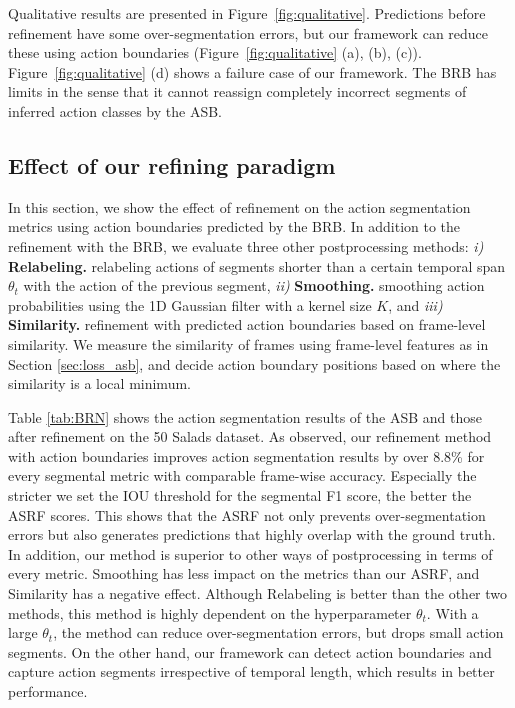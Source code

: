 \documentclass[10pt,twocolumn,letterpaper]{article}
\begin{document}
Qualitative results are presented in Figure~\ref{fig:qualitative}. 
Predictions before refinement have some over-segmentation errors, but our framework can reduce these using action boundaries (Figure~\ref{fig:qualitative} (a), (b), (c)).
Figure~\ref{fig:qualitative} (d) shows a failure case of our framework.
The BRB has limits in the sense that it cannot reassign completely incorrect segments
of inferred action classes by the ASB.


\subsection{Effect of our refining paradigm}
\label{sec:impact_asrf}
In this section, we show the effect of refinement on the action segmentation metrics using action boundaries predicted by the BRB.
In addition to the refinement with the BRB, we evaluate three other postprocessing methods:
\textit{i)} \textbf{Relabeling.} relabeling actions of segments shorter than a certain temporal span $\theta_t$ with the action of the previous segment,
\textit{ii)} \textbf{Smoothing.} smoothing action probabilities using the 1D Gaussian filter with a kernel size $K$, and
\textit{iii)} \textbf{Similarity.} refinement with predicted action boundaries based on frame-level similarity.
We measure the similarity of frames using frame-level features as in Section \ref{sec:loss_asb},
and decide action boundary positions based on where the similarity is a local minimum. 

Table \ref{tab:BRN} shows the action segmentation results of the ASB and those after refinement on the 50 Salads dataset.
As observed, our refinement method with action boundaries improves action segmentation results by over 8.8\% for every segmental metric with comparable frame-wise accuracy.
Especially the stricter we set the IOU threshold for the segmental F1 score, the better the ASRF scores.
This shows that the ASRF not only prevents over-segmentation errors but also generates predictions that highly overlap with the ground truth.
In addition, our method is superior to other ways of postprocessing in terms of every metric.
Smoothing has less impact on the metrics than our ASRF, and Similarity has a negative effect.
Although Relabeling is better than the other two methods, this method is highly dependent on the hyperparameter $\theta_t$.
With a large $\theta_t$, the method can reduce over-segmentation errors, but drops small action segments.
On the other hand, our framework can detect action boundaries and capture action segments irrespective of temporal length, which results in better performance.
\end{document}
